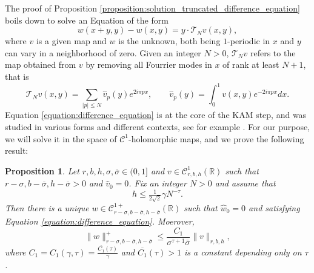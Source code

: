 \documentclass[10pt]{article}
\newtheorem{proposition}[theorem]{Proposition}
\newcommand{\RR}{\mathbb{R}}
\begin{document}
The proof of Proposition \ref{proposition:solution_truncated_difference_equation} boils down to solve an Equation of the form
\begin{equation}
\label{equation:difference_equation}
w(x+y,y)-w(x,y) = y\cdot \mathscr T_N v(x,y),
\end{equation}
where $v$ is a given map and $w$ is the unknown, both being $1$-periodic in $x$ and $y$ can vary in a neighborhood of zero. Given an integer $N>0$, $\mathscr T_N v$ refers to the map obtained from $v$ by removing all Fourrier modes in $x$ of rank at least $N+1$, that is 
\[
\mathscr T_N v(x,y) = \sum_{|p|\leq N}\widehat v_p(y)e^{2i\pi px},
\qquad 
\widehat v_p(y) = \int_0^1v(x,y)e^{-2i\pi px}dx.
\]
Equation \eqref{equation:difference_equation} is at the core of the KAM step, and was studied in various forms and different contexts, see for example \cite{Lazutkin_KAM, MartinRamirezTamarit, CMS}. For our purpose, we will solve it in the space of $\mathscr C^1$-holomorphic maps, and we prove the following result:

\begin{proposition}
\label{prop:cohomological_equation}
Let $r,b,h,\sigma,\overline\sigma\in(0,1]$ and $v\in\mathscr C^{1}_{r,b,h}(\RR)$ such that $r-\sigma,b-\overline\sigma,h-\overline\sigma>0$ and $\widehat v_0=0$. Fix an integer $N > 0$ and assume that 
\[
h \leq \tfrac{1}{2\sqrt 2}\gamma N^{-\tau}.
\]
Then there is a unique $w\in\mathscr C^{1+}_{r-\sigma,b-\overline\sigma,h-\overline\sigma}(\RR)$ such that $\widehat w_0=0$ and satisfying Equation \eqref{equation:difference_equation}. Moerover,
\[
\|w\|_{r-\sigma,b-\overline\sigma,h-\overline\sigma}^+
\leq 
\frac{C_1}{\sigma^{\tau+1}\overline\sigma}
\|v\|_{r,b,h},
\]
where $C_1 = C_1(\gamma, \tau) = \tfrac{\overline{C_1}(\tau)}{\gamma}$ 
and 
$\overline{C_1}(\tau) > 1$ 
is a constant depending only on $\tau$.
\end{proposition}
\end{document}
